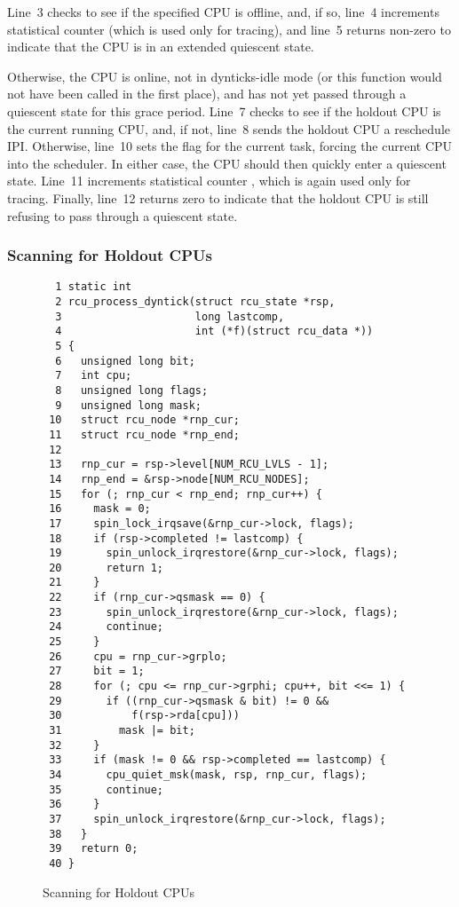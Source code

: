Line~3 checks to see if the specified CPU is offline, and, if so,
line~4 increments statistical counter  (which is
used only for tracing), and line~5 returns non-zero to indicate
that the CPU is in an extended quiescent state.

Otherwise, the CPU is online, not in dynticks-idle mode (or this
function would not have been called in the first place), and has
not yet passed through a quiescent state for this grace period.
Line~7 checks to see if the holdout CPU is the current running
CPU, and, if not, line~8 sends the holdout CPU a reschedule IPI.
Otherwise, line~10 sets the  flag for the
current task, forcing the current CPU into the scheduler.
In either case, the CPU should then quickly enter a quiescent
state.
Line~11 increments statistical counter , which is
again used only for tracing.
Finally, line~12 returns zero to indicate that the holdout CPU is
still refusing to pass through a quiescent state.

\subsubsection{Scanning for Holdout CPUs}
\label{app:rcuimpl:rcutreewt:Scanning for Holdout CPUs}

\begin{figure}[tbp]
{ \scriptsize
\begin{verbatim}
  1 static int
  2 rcu_process_dyntick(struct rcu_state *rsp,
  3                     long lastcomp,
  4                     int (*f)(struct rcu_data *))
  5 {
  6   unsigned long bit;
  7   int cpu;
  8   unsigned long flags;
  9   unsigned long mask;
 10   struct rcu_node *rnp_cur;
 11   struct rcu_node *rnp_end;
 12
 13   rnp_cur = rsp->level[NUM_RCU_LVLS - 1];
 14   rnp_end = &rsp->node[NUM_RCU_NODES];
 15   for (; rnp_cur < rnp_end; rnp_cur++) {
 16     mask = 0;
 17     spin_lock_irqsave(&rnp_cur->lock, flags);
 18     if (rsp->completed != lastcomp) {
 19       spin_unlock_irqrestore(&rnp_cur->lock, flags);
 20       return 1;
 21     }
 22     if (rnp_cur->qsmask == 0) {
 23       spin_unlock_irqrestore(&rnp_cur->lock, flags);
 24       continue;
 25     }
 26     cpu = rnp_cur->grplo;
 27     bit = 1;
 28     for (; cpu <= rnp_cur->grphi; cpu++, bit <<= 1) {
 29       if ((rnp_cur->qsmask & bit) != 0 &&
 30           f(rsp->rda[cpu]))
 31         mask |= bit;
 32     }
 33     if (mask != 0 && rsp->completed == lastcomp) {
 34       cpu_quiet_msk(mask, rsp, rnp_cur, flags);
 35       continue;
 36     }
 37     spin_unlock_irqrestore(&rnp_cur->lock, flags);
 38   }
 39   return 0;
 40 }
\end{verbatim}
}
\caption{Scanning for Holdout CPUs}
\label{fig:app:rcuimpl:rcutreewt:Scanning for Holdout CPUs}
\end{figure}

